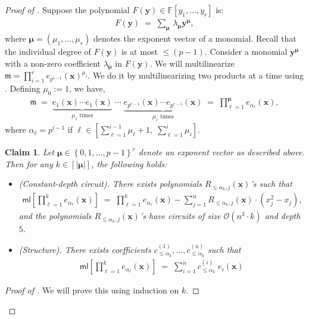 \documentclass[11pt]{article}
\newtheorem{claim}[theorem]{Claim}
\newcommand{\bigO}{\mathcal{O}}
\newcommand{\brac}[1]{\left[ #1 \right]}
\newcommand{\set}[1]{\left\{ #1 \right\}}
\newcommand{\F}{\mathbb{F}}
\newcommand{\ml}{\mathsf{ml}}
\begin{document}
\begin{proof}[Proof of ]
Suppose the polynomial $F(\mathbf{y}) \in \F[y_{1},\ldots,y_{r}]$ is:
\begin{align*}
    F(\mathbf{y}) \; = \; \sum_{\bm{\mu}} \, \lambda_{\bm{\mu}} \mathbf{y}^{\bm{\mu}},
\end{align*}
where $\bm{\mu} = (\mu_{1},\ldots,\mu_{r})$ denotes the exponent vector of a monomial. Recall that the individual degree of $F(\mathbf{y})$ is at most $\leq (p-1)$. Consider a monomial $\mathbf{y}^{\bm{\mu}}$ with a non-zero coefficient $\lambda_{\bm{\mu}}$ in $F(\mathbf{y})$. We will multilinearize $\mathfrak{m} = \prod_{i=1}^{r} e_{p^{i-1}}(\mathbf{x})^{\mu_{i}}$. We do it by multilinearizing two products at a time using . Defining $\mu_{0} := 1$, we have,
\begin{align*}
    \mathfrak{m} \; = \; \underbrace{e_{1}(\mathbf{x}) \cdots e_{1}(\mathbf{x})}_{\mu_{1} \text{ times}} \; \cdots \; \underbrace{e_{p^{r-1}}(\mathbf{x}) \cdots e_{p^{r-1}}(\mathbf{x})}_{\mu_{r} \text{ times}} \; = \; \prod_{\ell = 1}^{\bm{\mu}} e_{\alpha_{\ell}}(\mathbf{x}),
\end{align*}
where $\alpha_{\ell} = p^{i-1}$ if $\ell \in  \brac{\sum_{\ell=1}^{i-1} \mu_{\ell} + 1, \; \sum_{\ell=1}^{i} \mu_{i}}$.\\

\begin{claim}\label{claim:multilinearize-exponent-vector}
Let $\bm{\mu} \in \set{0,1,\ldots,p-1}^{r}$ denote an exponent vector as described above. Then for any $k \in [|\bm{\mu}|]$, the following holds:
\begin{itemize}
    \item (Constant-depth circuit). There exists polynomials $R_{\leq \alpha_{k}, j}(\mathbf{x})$'s such that
    \begin{align*}
        \ml\brac{\prod_{\ell = 1}^{k} e_{\alpha_{\ell}}(\mathbf{x})} \; = \; \prod_{\ell=1}^{k} e_{\alpha_{\ell}}(\mathbf{x}) - \sum_{j=1}^{n} R_{\leq \alpha_{k}, j}(\mathbf{x}) \cdot (x_{j}^{2} - x_{j}),
    \end{align*}
    and the polynomials $R_{\leq \alpha_{k}, j}(\mathbf{x})$'s have circuits of size $\bigO(n^{3} \cdot k)$ and depth $5$.
    \item (Structure). There exists coefficients $c_{\leq \alpha_{k}}^{(1)}, \ldots, c_{\leq \alpha_{k}}^{(n)}$ such that
    \begin{align*}
        \ml\brac{\prod_{\ell = 1}^{k} e_{\alpha_{\ell}}(\mathbf{x})} \; = \; \sum_{i=1}^{n} c_{\leq \alpha_{k}}^{(i)} \; e_{i}(\mathbf{x})
    \end{align*}
\end{itemize}
\end{claim}
\begin{proof}[Proof of ]
We will prove this using induction on $k$.

\end{proof}
\end{proof}
\end{document}
